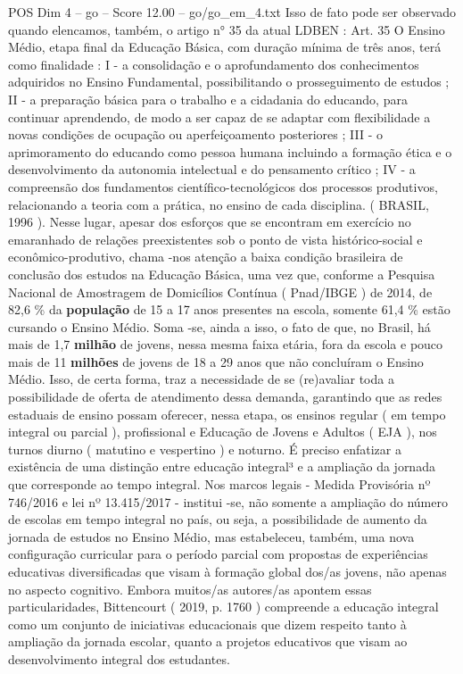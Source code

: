 \begin{textsample}{POS Dim 4 – go – Score 12.00 – go/go\_em\_4.txt}
Isso de fato pode ser observado quando elencamos, também, o artigo n{\EmojiFont °} 35 da atual LDBEN : Art. 35 O Ensino Médio, etapa final da Educação Básica, com duração mínima de três anos, terá como finalidade : I - a consolidação e o aprofundamento dos conhecimentos adquiridos no Ensino Fundamental, possibilitando o prosseguimento de estudos ; II - a preparação básica para o trabalho e a cidadania do educando, para continuar aprendendo, de modo a ser capaz de se adaptar com flexibilidade a novas condições de ocupação ou aperfeiçoamento posteriores ; III - o aprimoramento do educando como pessoa humana incluindo a formação ética e o desenvolvimento da autonomia intelectual e do pensamento crítico ; IV - a compreensão dos fundamentos científico-tecnológicos dos processos produtivos, relacionando a teoria com a prática, no ensino de cada disciplina. ( BRASIL, 1996 ).
Nesse lugar, apesar dos esforços que se encontram em exercício no emaranhado de relações preexistentes sob o ponto de vista histórico-social e econômico-produtivo, chama -nos atenção a baixa condição brasileira de conclusão dos estudos na Educação Básica, uma vez que, conforme a Pesquisa Nacional de Amostragem de Domicílios Contínua ( Pnad/IBGE ) de 2014, de 82,6 \% da \textbf{população} de 15 a 17 anos presentes na escola, somente 61,4 \% estão cursando o Ensino Médio.
Soma -se, ainda a isso, o fato de que, no Brasil, há mais de 1,7 \textbf{milhão} de jovens, nessa mesma faixa etária, fora da escola e pouco mais de 11 \textbf{milhões} de jovens de 18 a 29 anos que não concluíram o Ensino Médio.
Isso, de certa forma, traz a necessidade de se (re)avaliar toda a possibilidade de oferta de atendimento dessa demanda, garantindo que as redes estaduais de ensino possam oferecer, nessa etapa, os ensinos regular ( em tempo integral ou parcial ), profissional e Educação de Jovens e Adultos ( EJA ), nos turnos diurno ( matutino e vespertino ) e noturno.
É preciso enfatizar a existência de uma distinção entre educação integral³ e a ampliação da jornada que corresponde ao tempo integral.
Nos marcos legais - Medida Provisória nº 746/2016 e lei nº 13.415/2017 - institui -se, não somente a ampliação do número de escolas em tempo integral no país, ou seja, a possibilidade de aumento da jornada de estudos no Ensino Médio, mas estabeleceu, também, uma nova configuração curricular para o período parcial com propostas de experiências educativas diversificadas que visam à formação global dos/as jovens, não apenas no aspecto cognitivo.
Embora muitos/as autores/as apontem essas particularidades, Bittencourt ( 2019, p. 1760 ) compreende a educação integral como um conjunto de iniciativas educacionais que dizem respeito tanto à ampliação da jornada escolar, quanto a projetos educativos que visam ao desenvolvimento integral dos estudantes.

\end{textsample}
